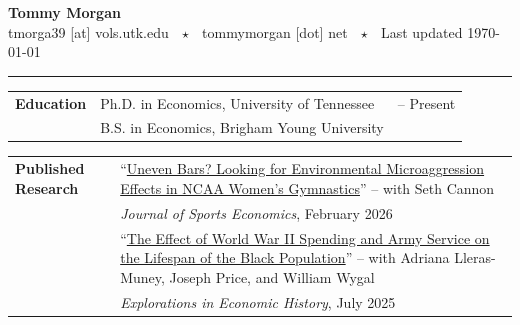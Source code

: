\documentclass[11pt]{article}
\newcommand*{\tabindent}{ \hspace{0.75cm}} %
\begin{document}
    {\LARGE \textbf{Tommy Morgan}} \\[5pt]
    tmorga39 [at] vols.utk.edu $~~\star~~$ tommymorgan [dot] net $~~\star~~$ Last updated \today
    \vspace{0.30cm}
    \hrule
    \vspace{0.30cm}


    \noindent
    \begin{tabularx}{\textwidth}{@{} p{3.75cm} X >{\raggedleft\arraybackslash}p{3.5cm} @{}}

        \textbf{Education} & Ph.D. in Economics, \textcolor{UTorange}{University of Tennessee} & 2024 -- Present \\

                            & B.S. in Economics, \textcolor{BYUnavy}{Brigham Young University} & 2023 \\
    \end{tabularx}

    \vspace{0.4cm}


    \noindent
    \begin{tabularx}{\textwidth}{@{} p{3.75cm} >{\RaggedRight \arraybackslash}X @{}}
        \textbf{Published Research} 
        & ``\href{https://doi.org/10.1177/15270025251396501}{Uneven Bars? Looking for Environmental Microaggression Effects in NCAA Women's Gymnastics}'' -- with Seth Cannon \\
        & \tabindent \textit{Journal of Sports Economics}, February 2026 \\[6pt]

        & ``\href{https://doi.org/10.1016/j.eeh.2025.101693}{The Effect of World War II Spending and Army Service on the Lifespan of the Black Population}'' -- with Adriana Lleras-Muney, Joseph Price, and William Wygal \\
        & \tabindent \textit{Explorations in Economic History}, July 2025 \\
    \end{tabularx}
\end{document}
